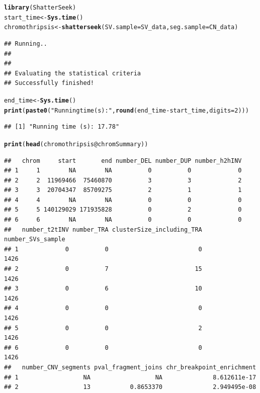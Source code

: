 \documentclass[twoside,a4wide,11pt]{article}\usepackage[]{graphicx}\usepackage[]{color}
\makeatletter
\newcommand{\hlnum}[1]{\textcolor[rgb]{0.686,0.059,0.569}{#1}}%
\newcommand{\hlstr}[1]{\textcolor[rgb]{0.192,0.494,0.8}{#1}}%
\newcommand{\hlopt}[1]{\textcolor[rgb]{0,0,0}{#1}}%
\newcommand{\hlstd}[1]{\textcolor[rgb]{0.345,0.345,0.345}{#1}}%
\newcommand{\hlkwb}[1]{\textcolor[rgb]{0.69,0.353,0.396}{#1}}%
\newcommand{\hlkwc}[1]{\textcolor[rgb]{0.333,0.667,0.333}{#1}}%
\newcommand{\hlkwd}[1]{\textcolor[rgb]{0.737,0.353,0.396}{\textbf{#1}}}%
\newenvironment{kframe}{%
 \def\at@end@of@kframe{}%
 \ifinner\ifhmode%
  \def\at@end@of@kframe{\end{minipage}}%
  \begin{minipage}{\columnwidth}%
 \fi\fi%
 \def\FrameCommand##1{\hskip\@totalleftmargin \hskip-\fboxsep
 \colorbox{shadecolor}{##1}\hskip-\fboxsep
     \hskip-\linewidth \hskip-\@totalleftmargin \hskip\columnwidth}%
 \MakeFramed {\advance\hsize-\width
   \@totalleftmargin\z@ \linewidth\hsize
   \@setminipage}}%
 {\par\unskip\endMakeFramed%
 \at@end@of@kframe}
\newenvironment{knitrout}{}{} %
\makeatother
\begin{document}
\begin{knitrout}
\color{fgcolor}\begin{kframe}
\begin{alltt}
\hlkwd{library}\hlstd{(ShatterSeek)}
\hlstd{start_time} \hlkwb{<-} \hlkwd{Sys.time}\hlstd{()}
\hlstd{chromothripsis} \hlkwb{<-} \hlkwd{shatterseek}\hlstd{(}\hlkwc{SV.sample}\hlstd{=SV_data,} \hlkwc{seg.sample}\hlstd{=CN_data)}
\end{alltt}
\begin{verbatim}
## Running..
## 
## 
## Evaluating the statistical criteria
## Successfully finished!
\end{verbatim}
\begin{alltt}
\hlstd{end_time} \hlkwb{<-} \hlkwd{Sys.time}\hlstd{()}
\hlkwd{print}\hlstd{(}\hlkwd{paste0}\hlstd{(}\hlstr{"Running time (s): "}\hlstd{,}\hlkwd{round}\hlstd{(end_time} \hlopt{-} \hlstd{start_time,}\hlkwc{digits}\hlstd{=}\hlnum{2}\hlstd{)))}
\end{alltt}
\begin{verbatim}
## [1] "Running time (s): 17.78"
\end{verbatim}
\begin{alltt}
\hlkwd{print}\hlstd{(}\hlkwd{head}\hlstd{(chromothripsis}\hlopt{@}\hlkwc{chromSummary}\hlstd{))}
\end{alltt}
\begin{verbatim}
##   chrom     start       end number_DEL number_DUP number_h2hINV
## 1     1        NA        NA          0          0             0
## 2     2  11969466  75460870          3          3             2
## 3     3  20704347  85709275          2          1             1
## 4     4        NA        NA          0          0             0
## 5     5 140129029 171935828          0          2             0
## 6     6        NA        NA          0          0             0
##   number_t2tINV number_TRA clusterSize_including_TRA number_SVs_sample
## 1             0          0                         0              1426
## 2             0          7                        15              1426
## 3             0          6                        10              1426
## 4             0          0                         0              1426
## 5             0          0                         2              1426
## 6             0          0                         0              1426
##   number_CNV_segments pval_fragment_joins chr_breakpoint_enrichment
## 1                  NA                  NA              8.612611e-17
## 2                  13           0.8653370              2.949495e-08

\end{verbatim}
\end{kframe}
\end{knitrout}
\end{document}
